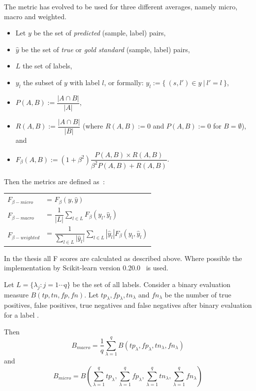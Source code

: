 The metric has evolved to be used for three different averages, namely micro, macro and weighted.
\begin{itemize}
    \item Let $y$ be the set of \textit{predicted} (sample, label) pairs,
    \item $\hat{y}$ be the set of \textit{true} or \textit{gold standard} (sample, label) pairs,
    \item $L$ the set of labels,
    \item $y_l$ the subset of $y$ with label $l$, or formally: $y_l := \{ \: (s, l') \in y \: | \: l' = l \: \}$,
    \item $P(A,B) := \dfrac{|A \cap B|}{|A|}$,
    \item $R(A,B) := \dfrac{|A \cap B|}{|B|}$ (where $R(A,B) := 0$ and $P(A,B) := 0$ for $B = \emptyset$), \hspace*{2mm} and
    \item $F_\beta(A, B) := (1 + \beta^2) \dfrac{P(A,B) \times R(A,B)}{\beta^2 P(A,B) + R(A,B)}$.
\end{itemize}

\noindent Then the metrics are defined as~\citep{scikit2019fscore}:

\begin{center}
    \begin{tabular}{l l}
        $F_{\beta-micro}$ &= $F_\beta(y, \hat{y})$ \\[4mm]
        $F_{\beta-macro}$ &= $\dfrac{1}{|L|} \sum_{l \in L} F_\beta(y_l, \hat{y}_l)$ \\[4mm]
        $F_{\beta-weighted}$ &= $\dfrac{1}{\sum_{l \in L}{|\hat{y}_l}|} \sum_{l \in L} | \hat{y}_l | F_\beta(y_l, \hat{y}_l)$
    \end{tabular}
\end{center}

In the thesis all F scores are calculated as described above.
Where possible the implementation by Scikit-learn version 0.20.0~\citep{scikit2018classification} is used.

\iffalse
Let $L = \{\lambda_j : j = 1 \cdots q\}$ be the set of all labels.
Consider a binary evaluation measure $B(tp, tn, fp, fn)$.
Let $tp_\lambda, fp_\lambda, tn_\lambda$ and $fn_\lambda$ be the number of true positives, false positives, true negatives and false negatives after binary evaluation for a label \lambda.

Then~\citep{van2013macro}
\[
    B_{macro} = \frac{1}{q} \sum_{\lambda=1}^q B(tp_\lambda, fp_\lambda, tn_\lambda, fn_\lambda)
\]
and~\citep{van2013macro}
\[
    B_{micro} = B \left( \sum_{\lambda=1}^q tp_\lambda, \sum_{\lambda=1}^q fp_\lambda, \sum_{\lambda=1}^q tn_\lambda, \sum_{\lambda=1}^q fn_\lambda \right)
\]

